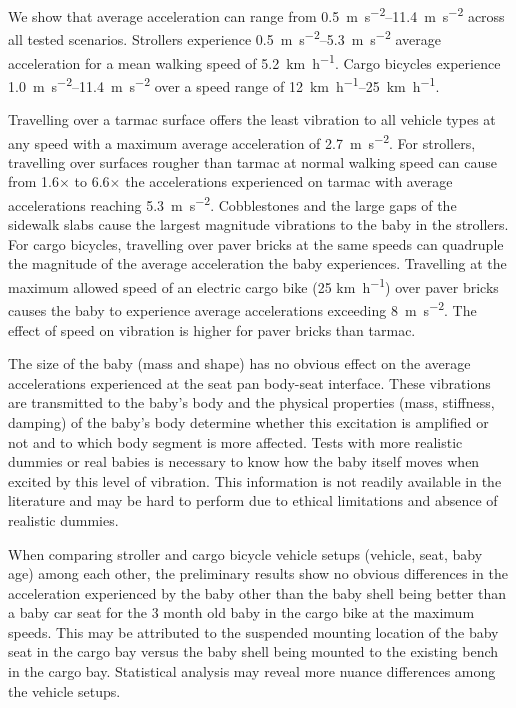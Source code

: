 \documentclass[a4paper]{article}
\begin{document}
We show that average acceleration can range from
\SIrange{0.5}{11.4}{\meter\per\second\squared} across all tested scenarios.
Strollers experience \SIrange{0.5}{5.3}{\meter\per\second\squared} average
acceleration for a mean walking speed of 5.2~\si{\kilo\meter\per\hour}. Cargo
bicycles experience \SIrange{1.0}{11.4}{\meter\per\second\squared} over a speed
range of \SIrange{12}{25}{\kilo\meter\per\hour}.

Travelling over a tarmac surface offers the least vibration to all vehicle types
at any speed with a maximum average acceleration of
2.7~\si{\meter\per\second\squared}. For strollers, travelling over surfaces
rougher than tarmac at normal walking speed can cause from 1.6\(\times\) to
6.6\(\times\) the accelerations experienced on tarmac with average accelerations
reaching 5.3~\si{\meter\per\second\squared}. Cobblestones and the large gaps of
the sidewalk slabs cause the largest magnitude vibrations to the baby in the
strollers. For cargo bicycles, travelling over paver bricks at the same speeds
can quadruple the magnitude of the average acceleration the baby experiences.
Travelling at the maximum allowed speed of an electric cargo bike (25
\si{\kilo\meter\per\hour}) over paver bricks causes the baby to experience
average accelerations exceeding 8~\si{\meter\per\second\squared}. The effect of
speed on vibration is higher for paver bricks than tarmac.

The size of the baby (mass and shape) has no obvious effect on the average
accelerations experienced at the seat pan body-seat interface. These vibrations
are transmitted to the baby's body and the physical properties (mass, stiffness,
damping) of the baby's body determine whether this excitation is amplified or
not and to which body segment is more affected. Tests with more realistic
dummies or real babies is necessary to know how the baby itself moves when
excited by this level of vibration. This information is not readily available in
the literature and may be hard to perform due to ethical limitations and absence
of realistic dummies.

When comparing stroller and cargo bicycle vehicle setups (vehicle, seat, baby
age) among each other, the preliminary results show no obvious differences in
the acceleration experienced by the baby other than the baby shell being better
than a baby car seat for the 3 month old baby in the cargo bike at the maximum
speeds. This may be attributed to the suspended mounting location of the baby
seat in the cargo bay versus the baby shell being mounted to the existing bench
in the cargo bay. Statistical analysis may reveal more nuance differences among
the vehicle setups.
\end{document}
